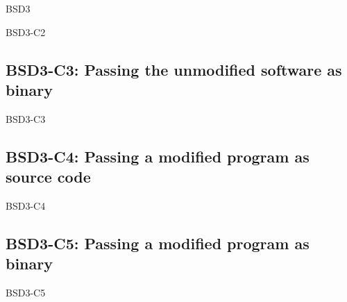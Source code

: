 \begin{license}{BSD3}
\begin{lsuc}{BSD3-C2}
  \begin{lsucprohibits}
    \lsucitem{\dontUseAuthorNames}%
  \end{lsucprohibits}
\end{lsuc}

\subsection{BSD3-C3: Passing the unmodified software as binary}
\begin{lsuc}{BSD3-C3}

  \lsucmeans{\useCaseThree}
  \lsuccovers{\coversThree}

  \begin{lsucrequires}  
    \lsucmandatory{\insertLicenseIntoBinary}\passingFilesCorrectly
  \end{lsucrequires}

  \begin{lsucprohibits}
    \lsucitem{\dontUseAuthorNames}%
  \end{lsucprohibits}
\end{lsuc}

\subsection{BSD3-C4: Passing a modified program as source code}
\begin{lsuc}{BSD3-C4}

  \lsucmeans{\useCaseFour}
  \lsuccovers{\coversFour}

  \begin{lsucrequires}
    \lsucmandatory{\keepLicenseElements}
    \lsucoptional{\addLicenseToCopyrightMessage}
  \end{lsucrequires}

  \begin{lsucprohibits}
    \lsucitem{\dontUseAuthorNames}%
  \end{lsucprohibits}
\end{lsuc}

\subsection{BSD3-C5: Passing a modified program as binary}
\begin{lsuc}{BSD3-C5}


\end{lsuc}
\end{license}
